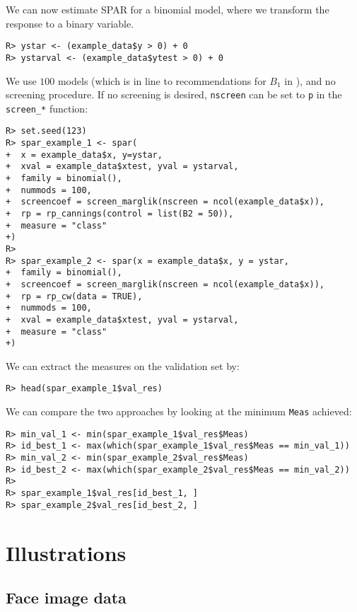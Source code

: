 \documentclass[
  article]{jss}
\begin{document}
We can now estimate SPAR for a binomial model, where we transform the
response to a binary variable.

\begin{verbatim}
R> ystar <- (example_data$y > 0) + 0
R> ystarval <- (example_data$ytest > 0) + 0
\end{verbatim}

We use \(100\) models (which is in line to recommendations for \(B_1\)
in \citet{cannings2017random}), and no screening procedure. If no
screening is desired, \texttt{nscreen} can be set to \texttt{p} in the
\texttt{screen\_*} function:

\begin{verbatim}
R> set.seed(123)   
R> spar_example_1 <- spar(
+  x = example_data$x, y=ystar,
+  xval = example_data$xtest, yval = ystarval,
+  family = binomial(),
+  nummods = 100, 
+  screencoef = screen_marglik(nscreen = ncol(example_data$x)),
+  rp = rp_cannings(control = list(B2 = 50)),
+  measure = "class"
+)
R> 
R> spar_example_2 <- spar(x = example_data$x, y = ystar,
+  family = binomial(),
+  screencoef = screen_marglik(nscreen = ncol(example_data$x)),
+  rp = rp_cw(data = TRUE),
+  nummods = 100, 
+  xval = example_data$xtest, yval = ystarval,
+  measure = "class"
+)
\end{verbatim}

We can extract the measures on the validation set by:

\begin{verbatim}
R> head(spar_example_1$val_res)
\end{verbatim}

We can compare the two approaches by looking at the minimum
\texttt{Meas} achieved:

\begin{verbatim}
R> min_val_1 <- min(spar_example_1$val_res$Meas)
R> id_best_1 <- max(which(spar_example_1$val_res$Meas == min_val_1))
R> min_val_2 <- min(spar_example_2$val_res$Meas)
R> id_best_2 <- max(which(spar_example_2$val_res$Meas == min_val_2))
R> 
R> spar_example_1$val_res[id_best_1, ]
R> spar_example_2$val_res[id_best_2, ]
\end{verbatim}

\section{Illustrations}\label{sec-illustrations}

\subsection{Face image data}\label{face-image-data}
\end{document}
